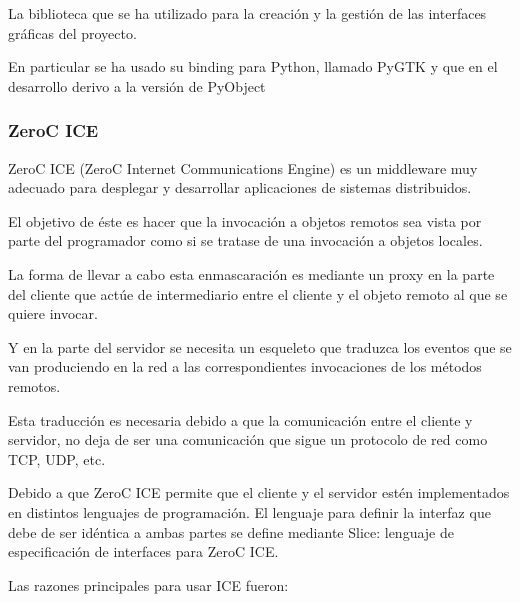 La biblioteca que se
ha utilizado para la creación y la gestión de las interfaces gráficas del
proyecto.

En particular se ha usado su binding para Python, llamado PyGTK
y que en el desarrollo derivo
a la versión de PyObject

\newpage

\subsubsection{ZeroC ICE}
\label{sec:ZeroICE}
ZeroC \acs{ICE}\label{acro:CIE} (ZeroC Internet Communications Engine) es un
middleware muy adecuado para desplegar y desarrollar aplicaciones de
sistemas distribuidos.

El objetivo de éste es hacer que la invocación a objetos remotos sea vista
por parte del programador como si se tratase de una invocación a objetos
locales.

La forma de llevar a cabo esta enmascaración es mediante un proxy en la
parte del cliente que actúe de intermediario entre el cliente y el objeto
remoto al que se quiere invocar.

Y en la parte del servidor se necesita un esqueleto que traduzca los eventos
que se van produciendo en la red a las correspondientes invocaciones de los
métodos remotos.

Esta traducción es necesaria debido a que la comunicación entre el
cliente y servidor, no deja de ser una comunicación que sigue un protocolo
de red como \acs{TCP}\label{acro:TCP}, \acs{UDP}\label{acro:UDP}, etc.

Debido a que ZeroC ICE permite que el cliente y el servidor estén
implementados en distintos lenguajes de programación. El lenguaje para
definir la interfaz que debe de ser idéntica a ambas partes se define
mediante Slice: lenguaje de especificación de interfaces para ZeroC ICE.

Las razones principales para usar ICE fueron:


